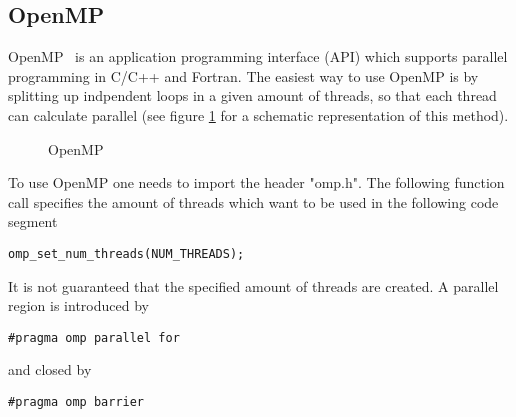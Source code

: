 \documentclass[a4paper]{article}
\begin{document}
\subsection{OpenMP}

OpenMP~\cite{OpenMP} is an application programming interface (API) which supports parallel programming in C/C++ and Fortran. The easiest way to use OpenMP is by splitting up indpendent loops in a given amount of threads, so that each thread can calculate parallel (see figure \ref{im:openmp} for a schematic representation of this method). 

\begin{figure}[H]
\centering
{}
\label{im:openmp}
\caption{OpenMP}
\end{figure}

To use OpenMP one needs to import the header "omp.h". The following function call specifies the amount of threads which want to be used in the following code segment

\begin{center}
\texttt{omp\_set\_num\_threads(NUM\_THREADS);}
\end{center}

It is not guaranteed that the specified amount of threads are created. A parallel region is introduced by

\begin{center}
\texttt{\#pragma omp parallel for}
\end{center}

and closed by

\begin{center}
\texttt{\#pragma omp barrier}
\end{center}
\end{document}
